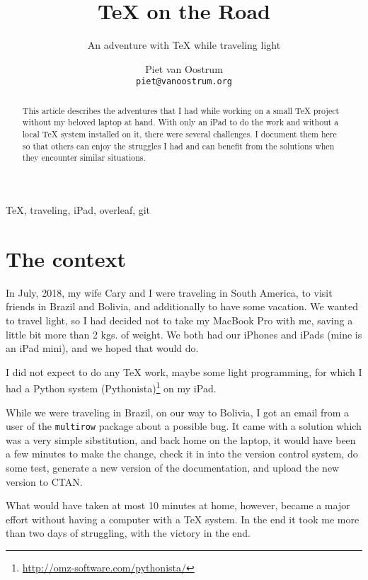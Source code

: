 \documentclass[nosubsub]{maps}
\begin{document}
\title{\TeX{} on the Road}

\subtitle{An adventure with \TeX{} while traveling light}

\author{%
  Piet van Oostrum\\
  \texttt{piet@vanoostrum.org}}

\maketitle

\begin{abstract}
This article describes the adventures that I had while working on a small \TeX{} project without my beloved laptop at hand. With only an iPad to do the work and without a local \TeX{} system installed on it, there were several challenges. I document them here so that others can enjoy the struggles I had and can benefit from the solutions when they encounter similar situations.
\end{abstract}

\begin{keywords}\TeX, traveling, iPad, overleaf, git
\end{keywords}

\section{The context}

In July, 2018, my wife Cary and I were traveling in South America, to visit friends in Brazil and Bolivia, and additionally to have some vacation. We wanted to travel light, so I had decided not to take my MacBook Pro with me, saving a little bit more than 2 kgs. of weight. We both had our iPhones and iPads (mine is an iPad mini), and we hoped that would do.

I did not expect to do any \TeX{} work, maybe some light programming, for which I had a Python system (Pythonista)\footnote{\url{http://omz-software.com/pythonista/}} on my iPad.

While we were traveling in Brazil, on our way to Bolivia, I got an email from a user of the \texttt{multirow} package about a possible bug. It came with a solution which was a very simple sibstitution, and back home on the laptop, it would have been a few minutes to make the change, check it in into the version control system, do some test, generate a new version of the documentation, and upload the new version to CTAN.

What would have taken at most 10 minutes at home, however, became a major effort without having a computer with a \TeX{} system. In the end it took me more than two days of struggling, with the victory in the end.
\end{document}
